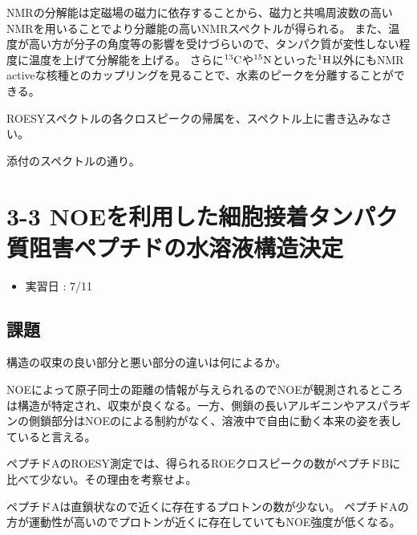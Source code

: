 \documentclass[a4paper,papersize,dvipdfmx]{jsarticle}
\begin{document}
NMRの分解能は定磁場の磁力に依存することから、磁力と共鳴周波数の高いNMRを用いることでより分離能の高いNMRスペクトルが得られる。
また、温度が高い方が分子の角度等の影響を受けづらいので、タンパク質が変性しない程度に温度を上げて分解能を上げる。
さらに$\rm ^{13}C$や$\rm ^{15}N$といった$\rm ^1H$以外にもNMR activeな核種とのカップリングを見ることで、水素のピークを分離することができる。


\begin{tcolorbox}[colback=white,colbacktitle=black!10!white,coltitle=black,title={4}]
ROESYスペクトルの各クロスピークの帰属を、スペクトル上に書き込みなさい。
\end{tcolorbox}

添付のスペクトルの通り。

\newpage


\section*{3-3 NOEを利用した細胞接着タンパク質阻害ペプチドの水溶液構造決定}

\begin{itemize}
\item 実習日 : 7/11

\end{itemize}
\subsection*{課題}


\begin{tcolorbox}[colback=white,colbacktitle=black!10!white,coltitle=black,title={1}]
構造の収束の良い部分と悪い部分の違いは何によるか。
\end{tcolorbox}

NOEによって原子同士の距離の情報が与えられるのでNOEが観測されるところは構造が特定され、収束が良くなる。一方、側鎖の長いアルギニンやアスパラギンの側鎖部分はNOEのによる制約がなく、溶液中で自由に動く本来の姿を表していると言える。



\begin{tcolorbox}[colback=white,colbacktitle=black!10!white,coltitle=black,title={2}]
ペプチドAのROESY測定では、得られるROEクロスピークの数がペプチドBに比べて少ない。その理由を考察せよ。
\end{tcolorbox}

ペプチドAは直鎖状なので近くに存在するプロトンの数が少ない。
ペプチドAの方が運動性が高いのでプロトンが近くに存在していてもNOE強度が低くなる。
\end{document}
